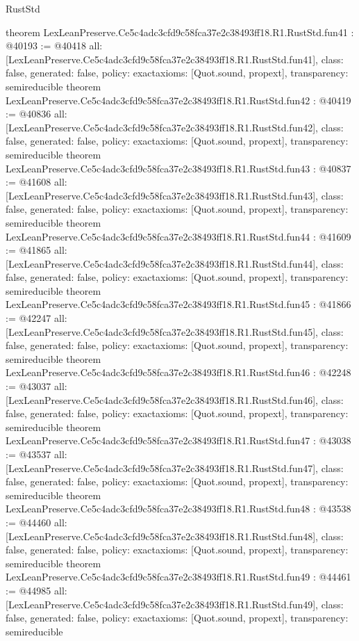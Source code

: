 \begin{lexlean}{RustStd}
\begin{coremodule}
{}
theorem LexLeanPreserve.Ce5c4adc3cfd9c58fca37e2c38493ff18.R1.RustStd.fun41 : @40193 := @40418 {
  all: [LexLeanPreserve.Ce5c4adc3cfd9c58fca37e2c38493ff18.R1.RustStd.fun41],
  class: false,
  generated: false,
  policy: exact{axioms: [Quot.sound, propext]},
  transparency: semireducible
}
theorem LexLeanPreserve.Ce5c4adc3cfd9c58fca37e2c38493ff18.R1.RustStd.fun42 : @40419 := @40836 {
  all: [LexLeanPreserve.Ce5c4adc3cfd9c58fca37e2c38493ff18.R1.RustStd.fun42],
  class: false,
  generated: false,
  policy: exact{axioms: [Quot.sound, propext]},
  transparency: semireducible
}
theorem LexLeanPreserve.Ce5c4adc3cfd9c58fca37e2c38493ff18.R1.RustStd.fun43 : @40837 := @41608 {
  all: [LexLeanPreserve.Ce5c4adc3cfd9c58fca37e2c38493ff18.R1.RustStd.fun43],
  class: false,
  generated: false,
  policy: exact{axioms: [Quot.sound, propext]},
  transparency: semireducible
}
theorem LexLeanPreserve.Ce5c4adc3cfd9c58fca37e2c38493ff18.R1.RustStd.fun44 : @41609 := @41865 {
  all: [LexLeanPreserve.Ce5c4adc3cfd9c58fca37e2c38493ff18.R1.RustStd.fun44],
  class: false,
  generated: false,
  policy: exact{axioms: [Quot.sound, propext]},
  transparency: semireducible
}
theorem LexLeanPreserve.Ce5c4adc3cfd9c58fca37e2c38493ff18.R1.RustStd.fun45 : @41866 := @42247 {
  all: [LexLeanPreserve.Ce5c4adc3cfd9c58fca37e2c38493ff18.R1.RustStd.fun45],
  class: false,
  generated: false,
  policy: exact{axioms: [Quot.sound, propext]},
  transparency: semireducible
}
theorem LexLeanPreserve.Ce5c4adc3cfd9c58fca37e2c38493ff18.R1.RustStd.fun46 : @42248 := @43037 {
  all: [LexLeanPreserve.Ce5c4adc3cfd9c58fca37e2c38493ff18.R1.RustStd.fun46],
  class: false,
  generated: false,
  policy: exact{axioms: [Quot.sound, propext]},
  transparency: semireducible
}
theorem LexLeanPreserve.Ce5c4adc3cfd9c58fca37e2c38493ff18.R1.RustStd.fun47 : @43038 := @43537 {
  all: [LexLeanPreserve.Ce5c4adc3cfd9c58fca37e2c38493ff18.R1.RustStd.fun47],
  class: false,
  generated: false,
  policy: exact{axioms: [Quot.sound, propext]},
  transparency: semireducible
}
theorem LexLeanPreserve.Ce5c4adc3cfd9c58fca37e2c38493ff18.R1.RustStd.fun48 : @43538 := @44460 {
  all: [LexLeanPreserve.Ce5c4adc3cfd9c58fca37e2c38493ff18.R1.RustStd.fun48],
  class: false,
  generated: false,
  policy: exact{axioms: [Quot.sound, propext]},
  transparency: semireducible
}
theorem LexLeanPreserve.Ce5c4adc3cfd9c58fca37e2c38493ff18.R1.RustStd.fun49 : @44461 := @44985 {
  all: [LexLeanPreserve.Ce5c4adc3cfd9c58fca37e2c38493ff18.R1.RustStd.fun49],
  class: false,
  generated: false,
  policy: exact{axioms: [Quot.sound, propext]},
  transparency: semireducible
}
\end{coremodule}
\end{lexlean}
